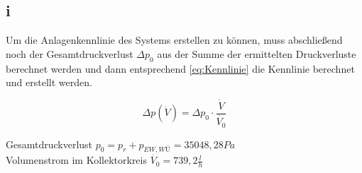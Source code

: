 \subsection{i}
Um die Anlagenkennlinie des Systems erstellen zu können, muss abschließend noch der
Gesamtdruckverlust $\Delta p_0$ aus der Summe der ermittelten Druckverluste berechnet werden
und dann entsprechend \autoref{eq:Kennlinie} die Kennlinie berechnet und erstellt werden.

\begin{equation}
    \label{eq:Kennlinie}
    \Delta p (\dot{V}) = \Delta p_0  \cdot \frac{\dot{V}}{ \dot{V_0} }
\end{equation}
\vspace{\baselineskip}
\begin{center}
    Gesamtdruckverlust $p_0 =p_r + p_{EW,WÜ} = 35048,28 Pa$\\
    Volumenstrom im Kollektorkreis $\dot{V_0} = 739,2\frac{l}{h}$
\end{center}